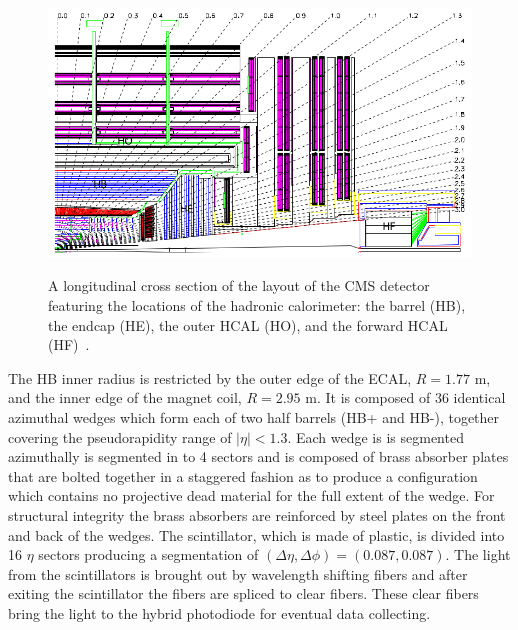 \begin{figure}[!Hh]
       \includegraphics[scale=0.6]{Figures/HCALlayout.png} \\
       \caption[Layout of the CMS hadronic calorimeter.]{A longitudinal cross section of the layout of the CMS detector featuring the locations of the hadronic calorimeter: the barrel (HB), the endcap (HE), the outer HCAL (HO), and the forward HCAL (HF)~\cite{CMSdetector}.}
\label{figapp:HCALlayout}
\end{figure}

The HB inner radius is restricted by the outer edge of the ECAL, $R=1.77$ m, and the inner edge of the magnet coil, $R=2.95$ m.  It is composed of 36 identical azimuthal wedges which form each of two half barrels (HB+ and HB-), together covering the pseudorapidity range of $|\eta| < 1.3$.  Each wedge is is segmented azimuthally is segmented in to 4 sectors and is composed of brass absorber plates that are bolted together in a staggered fashion as to produce a configuration which contains no projective dead material for the full extent of the wedge.  For structural integrity the brass absorbers are reinforced by steel plates on the front and back of the wedges.  The scintillator, which is made of plastic, is divided into 16 $\eta$ sectors producing a segmentation of $(\Delta\eta,\Delta\phi) = (0.087, 0.087)$.  The light from the scintillators is brought out by wavelength shifting fibers and after exiting the scintillator the fibers are spliced to clear fibers.  These clear fibers bring the light to the hybrid photodiode for eventual data collecting.  

